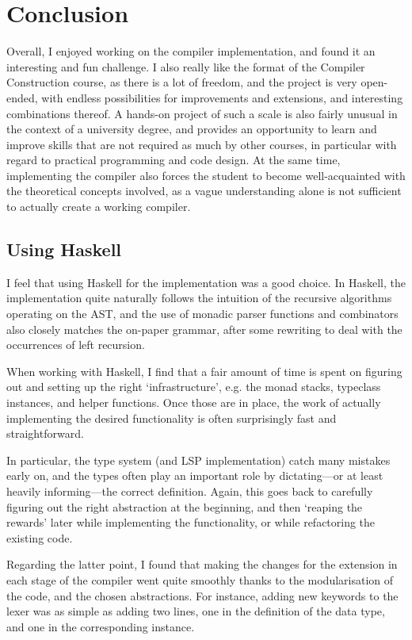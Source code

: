 \chapter{Conclusion} \label{chp:conclusion}

Overall, I enjoyed working on the compiler implementation, and found it an
interesting and fun challenge.
I also really like the format of the Compiler Construction course, as there is
a lot of freedom, and the project is very open-ended, with endless possibilities
for improvements and extensions, and interesting combinations thereof.
A hands-on project of such a scale is also fairly unusual in the context of a
university degree, and provides an opportunity to learn and improve skills that
are not required as much by other courses, in particular with regard to
practical programming and code design.
At the same time, implementing the compiler also forces the student to become
well-acquainted with the theoretical concepts involved, as a vague understanding
alone is not sufficient to actually create a working compiler.


\section{Using Haskell}
I feel that using Haskell for the implementation was a good choice. In Haskell,
the implementation quite naturally follows the intuition of the recursive
algorithms operating on the AST, and the use of monadic parser functions and
combinators also closely matches the on-paper grammar, after some rewriting to
deal with the occurrences of left recursion.

When working with Haskell, I find that a fair amount of time is spent on
figuring out and setting up the right `infrastructure', e.g. the monad stacks,
typeclass instances, and helper functions.
Once those are in place, the work of actually implementing the desired
functionality is often surprisingly fast and straightforward.

In particular, the type system (and LSP implementation) catch many mistakes
early on, and the types often play an important role by dictating---or at
least heavily informing---the correct definition.
Again, this goes back to carefully figuring out the right abstraction at the
beginning, and then `reaping the rewards' later while implementing the
functionality, or while refactoring the existing code.

Regarding the latter point, I found that making the changes for the extension in
each stage of the compiler went quite smoothly thanks to the modularisation of
the code, and the chosen abstractions.
For instance, adding new keywords to the lexer was as simple as adding two
lines, one in the definition of the  data type, and one in the
corresponding  instance.



